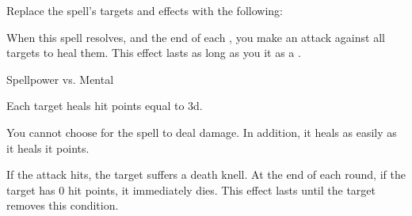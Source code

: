 


Replace the spell's targets and effects with the following:
\begin{spellcontent}

\begin{augmenttargetinginfo}




\end{augmenttargetinginfo}


\begin{augmenteffects}



\spelleffect
When this spell resolves, and the end of each , you make an attack against all targets to heal them.
This effect lasts as long as you  it as a .




\begin{spellattack}{Spellpower vs. Mental}


\spellsuccess
Each target heals hit points equal to  \minus3d.



\end{spellattack}





\end{augmenteffects}

\end{spellcontent}






You cannot choose for the spell to deal damage.
In addition, it heals  as easily as it heals it points.







If the attack hits, the target suffers a death knell.
At the end of each round, if the target has 0 hit points, it immediately dies.
This effect lasts until the target removes this condition.



\par


